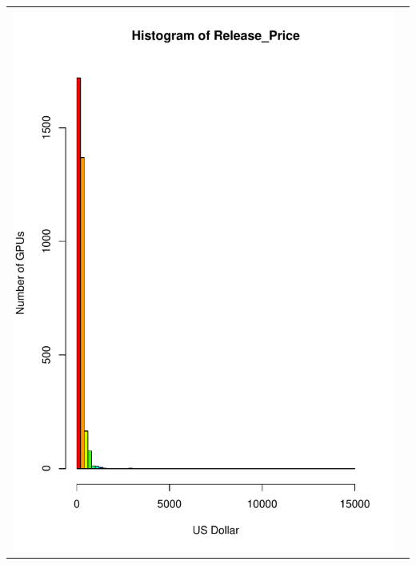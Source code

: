 \documentclass[a4paper]{article}
\begin{document}
\begin{center}
\begin{adjustbox}{width=\textwidth}
    \begin{tabular}{cc}
        \includegraphics[keepaspectratio, width=1\textwidth, height=1\textheight]{Visualization/Hist/release_price.pdf}

\end{tabular}
\end{adjustbox}
\end{center}
\end{document}
